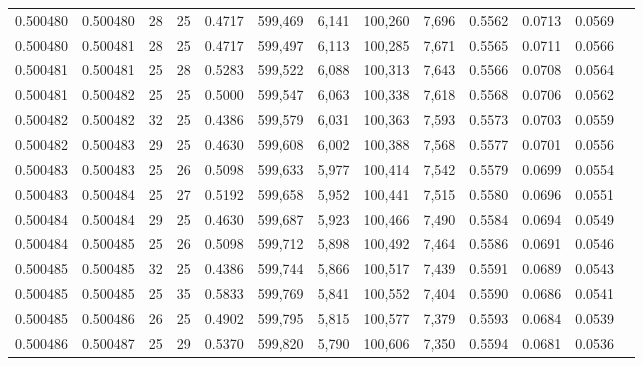 \begin{tabular}{rrrrrrrrrrrrr}
0.500480 & 0.500480 &    28 &  25 &                                     0.4717 & 599,469 &   6,141 & 100,260 &   7,696 & 0.5562 & 0.0713 & 0.0569 \\
0.500480 & 0.500481 &    28 &  25 &                                     0.4717 & 599,497 &   6,113 & 100,285 &   7,671 & 0.5565 & 0.0711 & 0.0566 \\
0.500481 & 0.500481 &    25 &  28 &                                     0.5283 & 599,522 &   6,088 & 100,313 &   7,643 & 0.5566 & 0.0708 & 0.0564 \\
0.500481 & 0.500482 &    25 &  25 &                                     0.5000 & 599,547 &   6,063 & 100,338 &   7,618 & 0.5568 & 0.0706 & 0.0562 \\
0.500482 & 0.500482 &    32 &  25 &                                     0.4386 & 599,579 &   6,031 & 100,363 &   7,593 & 0.5573 & 0.0703 & 0.0559 \\
0.500482 & 0.500483 &    29 &  25 &                                     0.4630 & 599,608 &   6,002 & 100,388 &   7,568 & 0.5577 & 0.0701 & 0.0556 \\
0.500483 & 0.500483 &    25 &  26 &                                     0.5098 & 599,633 &   5,977 & 100,414 &   7,542 & 0.5579 & 0.0699 & 0.0554 \\
0.500483 & 0.500484 &    25 &  27 &                                     0.5192 & 599,658 &   5,952 & 100,441 &   7,515 & 0.5580 & 0.0696 & 0.0551 \\
0.500484 & 0.500484 &    29 &  25 &                                     0.4630 & 599,687 &   5,923 & 100,466 &   7,490 & 0.5584 & 0.0694 & 0.0549 \\
0.500484 & 0.500485 &    25 &  26 &                                     0.5098 & 599,712 &   5,898 & 100,492 &   7,464 & 0.5586 & 0.0691 & 0.0546 \\
0.500485 & 0.500485 &    32 &  25 &                                     0.4386 & 599,744 &   5,866 & 100,517 &   7,439 & 0.5591 & 0.0689 & 0.0543 \\
0.500485 & 0.500485 &    25 &  35 &                                     0.5833 & 599,769 &   5,841 & 100,552 &   7,404 & 0.5590 & 0.0686 & 0.0541 \\
0.500485 & 0.500486 &    26 &  25 &                                     0.4902 & 599,795 &   5,815 & 100,577 &   7,379 & 0.5593 & 0.0684 & 0.0539 \\
0.500486 & 0.500487 &    25 &  29 &                                     0.5370 & 599,820 &   5,790 & 100,606 &   7,350 & 0.5594 & 0.0681 & 0.0536 \\

\end{tabular}
